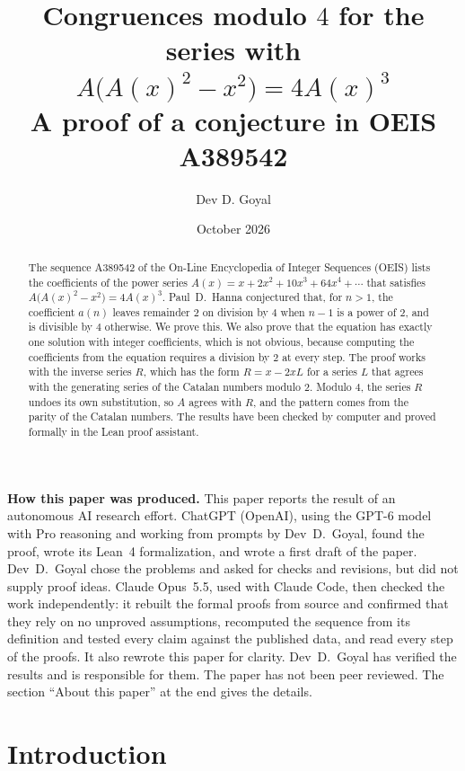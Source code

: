 \documentclass[11pt,a4paper]{article}
\title{Congruences modulo $4$ for the series with $A\bigl(A(x)^2-x^2\bigr)=4A(x)^3$\\[6pt]\large A proof of a conjecture in OEIS A389542}
\author{Dev D. Goyal}
\date{October 2026}
\theoremstyle{definition}
\theoremstyle{remark}
\begin{document}
\maketitle
\begin{abstract}
The sequence A389542 of the On-Line Encyclopedia of Integer Sequences (OEIS) lists the coefficients of the power series
$A(x)=x+2x^2+10x^3+64x^4+\cdots$ that satisfies $A\bigl(A(x)^2-x^2\bigr)=4A(x)^3$. Paul~D.~Hanna conjectured that, for
$n>1$, the coefficient $a(n)$ leaves remainder $2$ on division by $4$ when $n-1$ is a power of $2$, and is divisible by
$4$ otherwise. We prove this. We also prove that the equation has exactly one solution with integer coefficients, which
is not obvious, because computing the coefficients from the equation requires a division by $2$ at every step. The proof
works with the inverse series $R$, which has the form $R=x-2xL$ for a series $L$ that agrees with the generating series
of the Catalan numbers modulo $2$. Modulo $4$, the series $R$ undoes its own substitution, so $A$ agrees with $R$, and the
pattern comes from the parity of the Catalan numbers. The results have been checked by computer and proved formally in
the Lean proof assistant.
\end{abstract}
\begin{center}\begin{minipage}{0.88\linewidth}\small
\textbf{How this paper was produced.} This paper reports the result of an autonomous AI research effort.
ChatGPT (OpenAI), using the GPT-6 model with Pro reasoning and working from prompts by Dev~D.~Goyal, found the proof, wrote its Lean~4 formalization, and wrote a first draft of the paper.
Dev~D.~Goyal chose the problems and asked for checks and revisions, but did not supply proof ideas.
Claude Opus~5.5, used with Claude Code, then checked the work independently: it rebuilt the formal proofs from
source and confirmed that they rely on no unproved assumptions, recomputed the sequence from its definition and tested
every claim against the published data, and read every step of the proofs. It also rewrote this paper for clarity.
Dev~D.~Goyal has verified the results and is responsible for them. The paper has not been peer reviewed.
The section ``About this paper'' at the end gives the details.
\end{minipage}\end{center}

\section{Introduction}
\end{document}
